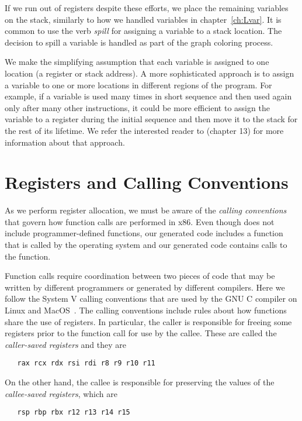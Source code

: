 \documentclass[7x10]{TimesAPriori_MIT}%
\numberwithin{theorem}{chapter}
\numberwithin{definition}{chapter}
\numberwithin{equation}{chapter}
\begin{document}
If we run out of registers despite these efforts, we place the
remaining variables on the stack, similarly to how we handled
variables in chapter~\ref{ch:Lvar}. It is common to use the verb
\emph{spill} for assigning a variable to a stack
location. The decision to spill a variable is handled as part of the
graph coloring process.

We make the simplifying assumption that each variable is assigned to
one location (a register or stack address). A more sophisticated
approach is to assign a variable to one or more locations in different
regions of the program.  For example, if a variable is used many times
in short sequence and then used again only after many other
instructions, it could be more efficient to assign the variable to a
register during the initial sequence and then move it to the stack for
the rest of its lifetime. We refer the interested reader to
\citet{Cooper:2011aa} (chapter 13) for more information about that
approach.


\section{Registers and Calling Conventions}
\label{sec:calling-conventions}

As we perform register allocation, we must be aware of the
\emph{calling conventions}  that
govern how function calls are performed in x86.
%
Even though \LangVar{} does not include programmer-defined functions,
our generated code includes a  function that is called by
the operating system and our generated code contains calls to the
 function.

Function calls require coordination between two pieces of code that
may be written by different programmers or generated by different
compilers. Here we follow the System V calling conventions that are
used by the GNU C compiler on Linux and
MacOS~\citep{Bryant:2005aa,Matz:2013aa}.
%
The calling conventions include rules about how functions share the
use of registers. In particular, the caller is responsible for freeing
some registers prior to the function call for use by the callee.
These are called the \emph{caller-saved registers}
and they are
\begin{lstlisting}
   rax rcx rdx rsi rdi r8 r9 r10 r11
\end{lstlisting}
On the other hand, the callee is responsible for preserving the values
of the \emph{callee-saved registers}, 
which are
\begin{lstlisting}
   rsp rbp rbx r12 r13 r14 r15
\end{lstlisting}
\end{document}
